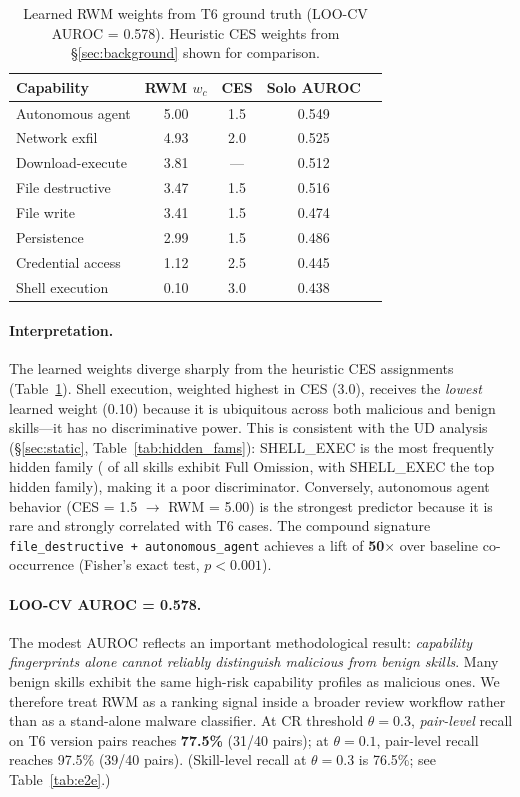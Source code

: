 \begin{table}[h]
\centering
\caption{Learned RWM weights from T6 ground truth (LOO-CV AUROC = 0.578). Heuristic CES weights from \S\ref{sec:background} shown for comparison.}
\label{tab:riskweights}
\small
\begin{tabular}{@{}lcccc@{}}
\toprule
\textbf{Capability} & \textbf{RWM $w_c$} & \textbf{CES} & \textbf{Solo AUROC} \\
\midrule
Autonomous agent   & 5.00 & 1.5 & 0.549 \\
Network exfil      & 4.93 & 2.0 & 0.525 \\
Download-execute   & 3.81 & --- & 0.512 \\
File destructive   & 3.47 & 1.5 & 0.516 \\
File write         & 3.41 & 1.5 & 0.474 \\
Persistence        & 2.99 & 1.5 & 0.486 \\
Credential access  & 1.12 & 2.5 & 0.445 \\
Shell execution    & 0.10 & 3.0 & 0.438 \\
\bottomrule
\end{tabular}
\end{table}

\paragraph{Interpretation.}
The learned weights diverge sharply from the heuristic CES
assignments (Table~\ref{tab:riskweights}). Shell execution,
weighted highest in CES (3.0), receives the \emph{lowest}
learned weight (0.10) because it is ubiquitous across both
malicious and benign skills---it has no discriminative power.
This is consistent with the UD analysis (\S\ref{sec:static},
Table~\ref{tab:hidden_fams}): SHELL\_EXEC is the most
frequently hidden family (\ResultICone{} of all skills exhibit
Full Omission, with SHELL\_EXEC the top hidden family), making it
a poor discriminator.
Conversely, autonomous agent behavior
(CES = 1.5 $\to$ RWM = 5.00) is the strongest predictor
because it is rare and strongly correlated with T6 cases.
The compound signature
\texttt{file\_destructive + autonomous\_agent} achieves a
lift of \textbf{50$\times$} over baseline co-occurrence
(Fisher's exact test, $p < 0.001$).

\paragraph{LOO-CV AUROC = 0.578.}
The modest AUROC reflects an important methodological result:
\emph{capability fingerprints alone cannot reliably distinguish
malicious from benign skills}.
Many benign skills exhibit the same high-risk capability profiles
as malicious ones.
We therefore treat RWM as a ranking signal inside a broader
review workflow rather than as a stand-alone malware classifier.
At CR threshold $\theta = 0.3$, \emph{pair-level} recall on T6 version pairs
reaches {\bf 77.5\%} (31/40 pairs);
at $\theta = 0.1$, pair-level recall reaches 97.5\% (39/40 pairs).
(Skill-level recall at $\theta=0.3$ is 76.5\%; see Table~\ref{tab:e2e}.)


